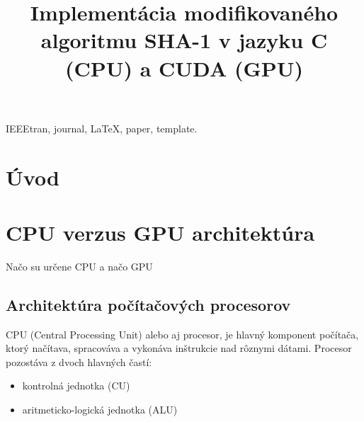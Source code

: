 \documentclass[conference]{IEEEtran}
\begin{document}
%
\title{Implementácia modifikovaného algoritmu SHA-1 v jazyku C (CPU) a CUDA (GPU)}

\author{
}


\maketitle

\begin{abstract}

\end{abstract}


\begin{IEEEkeywords}
IEEEtran, journal, \LaTeX, paper, template.
\end{IEEEkeywords}


\IEEEpeerreviewmaketitle


\section{Úvod}

\section{CPU verzus GPU architektúra}

Načo su určene CPU a načo GPU


\subsection{Architektúra počítačových procesorov}

CPU (Central Processing Unit) alebo aj procesor, je hlavný komponent počítača, ktorý načítava, spracováva a vykonáva inštrukcie nad rôznymi dátami. Procesor pozostáva z dvoch hlavných častí:

\begin{itemize}
	\item{kontrolná jednotka (CU)}
	\item{aritmeticko-logická jednotka (ALU)}
\end{itemize}
\end{document}

